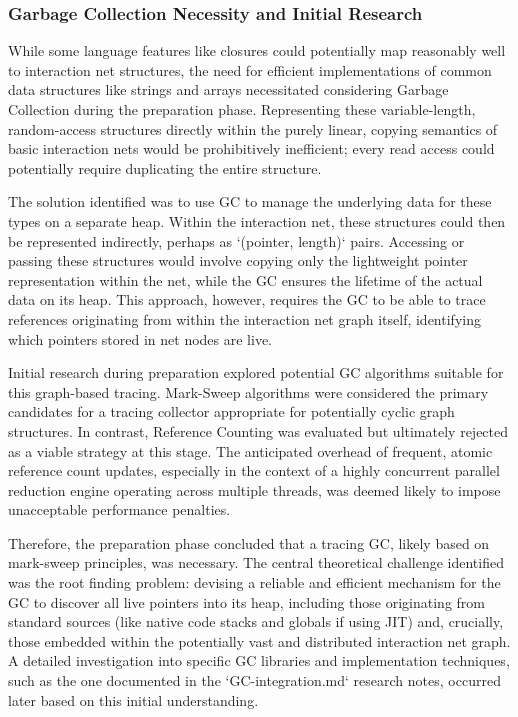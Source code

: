 \subsubsection{Garbage Collection Necessity and Initial Research}

While some language features like closures could potentially map reasonably well to interaction net structures, the need for efficient implementations of common data structures like strings and arrays necessitated considering Garbage Collection during the preparation phase. Representing these variable-length, random-access structures directly within the purely linear, copying semantics of basic interaction nets would be prohibitively inefficient; every read access could potentially require duplicating the entire structure. 

The solution identified was to use GC to manage the underlying data for these types on a separate heap. Within the interaction net, these structures could then be represented indirectly, perhaps as `(pointer, length)` pairs. Accessing or passing these structures would involve copying only the lightweight pointer representation within the net, while the GC ensures the lifetime of the actual data on its heap. This approach, however, requires the GC to be able to trace references originating from within the interaction net graph itself, identifying which pointers stored in net nodes are live.

Initial research during preparation explored potential GC algorithms suitable for this graph-based tracing. Mark-Sweep algorithms were considered the primary candidates for a tracing collector appropriate for potentially cyclic graph structures. In contrast, Reference Counting was evaluated but ultimately rejected as a viable strategy at this stage. The anticipated overhead of frequent, atomic reference count updates, especially in the context of a highly concurrent parallel reduction engine operating across multiple threads, was deemed likely to impose unacceptable performance penalties.

Therefore, the preparation phase concluded that a tracing GC, likely based on mark-sweep principles, was necessary. The central theoretical challenge identified was the root finding problem: devising a reliable and efficient mechanism for the GC to discover all live pointers into its heap, including those originating from standard sources (like native code stacks and globals if using JIT) and, crucially, those embedded within the potentially vast and distributed interaction net graph. A detailed investigation into specific GC libraries and implementation techniques, such as the one documented in the `GC-integration.md` research notes, occurred later based on this initial understanding.

